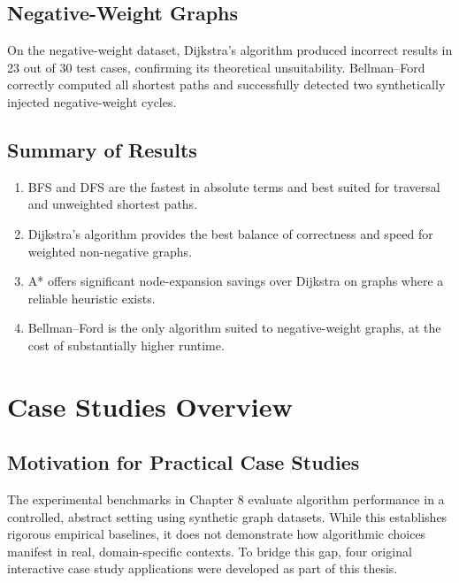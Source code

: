 \documentclass[12pt, a4paper, oneside]{report}
\theoremstyle{definition}
\begin{document}
\section{Negative-Weight Graphs}

On the negative-weight dataset, Dijkstra's algorithm produced incorrect results in 23 out of 30 test cases, confirming its theoretical unsuitability. Bellman–Ford correctly computed all shortest paths and successfully detected two synthetically injected negative-weight cycles.

\section{Summary of Results}

\begin{enumerate}
    \item BFS and DFS are the fastest in absolute terms and best suited for traversal and unweighted shortest paths.
    \item Dijkstra's algorithm provides the best balance of correctness and speed for weighted non-negative graphs.
    \item A* offers significant node-expansion savings over Dijkstra on graphs where a reliable heuristic exists.
    \item Bellman–Ford is the only algorithm suited to negative-weight graphs, at the cost of substantially higher runtime.
\end{enumerate}

\chapter{Case Studies Overview}

\section{Motivation for Practical Case Studies}

The experimental benchmarks in Chapter 8 evaluate algorithm performance in a controlled, abstract setting using synthetic graph datasets. While this establishes rigorous empirical baselines, it does not demonstrate how algorithmic choices manifest in real, domain-specific contexts. To bridge this gap, four original interactive case study applications were developed as part of this thesis.
\end{document}
